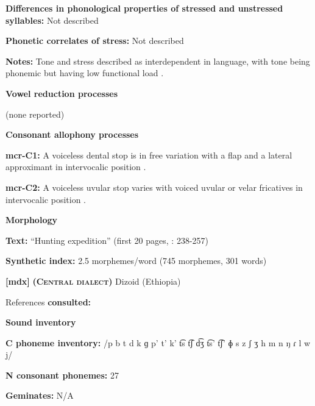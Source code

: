 \textbf{Differences in phonological properties of stressed and unstressed syllables:} Not described



\textbf{Phonetic correlates of stress:} Not described



\textbf{Notes:} Tone and stress described as interdependent in language, with tone being phonemic but having low functional load \citep[226]{Whitehead2004}. 



\textbf{Vowel reduction processes}



(none reported)



\textbf{Consonant allophony processes}



\textbf{mcr-C1:} A voiceless dental stop is in free variation with a flap and a lateral approximant in intervocalic position \citep[9]{Whitehead2004}.



\textbf{mcr-C2:} A voiceless uvular stop varies with voiced uvular or velar fricatives in intervocalic position \citep[9]{Whitehead2004}.



\textbf{Morphology}



\textbf{Text:} “Hunting expedition” (first 20 pages, \citealt{Whitehead2004}: 238-257)



\textbf{Synthetic index:} 2.5 morphemes/word (745 morphemes, 301 words)



\textbf{[mdx]}   \textbf{\textsc{ (Central dialect)}}  Dizoid (Ethiopia)



References \textbf{consulted:} \citet{Allan1976,Beachy2005,Breeze1988}



\textbf{Sound inventory}



\textbf{C phoneme inventory:} /p b t d k ɡ p’ t’ k’ t͡s t͡ʃ d͡ʒ t͡s’ t͡ʃ’ ɸ s z ʃ ʒ h m n ŋ ɾ l w j/



\textbf{N consonant phonemes:} 27



\textbf{Geminates:} N/A



